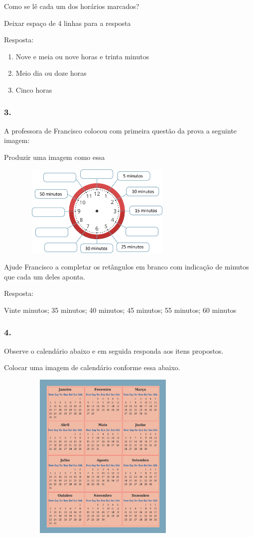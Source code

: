 Como se lê cada um dos horários marcados?

Deixar espaço de 4 linhas para a resposta

Resposta:

\begin{enumerate}
\def\labelenumi{\alph{enumi})}
\item
  Nove e meia ou nove horas e trinta minutos
\item
  Meio dia ou doze horas
\item
  Cinco horas
\end{enumerate}

\subsubsection{3.}\label{section-66}

A professora de Francisco colocou com primeira questão da prova a
seguinte imagem:

Produzir uma imagem como essa

\includegraphics[width=3.90034in,height=1.75015in]{media/image53.png}

Ajude Francisco a completar os retângulos em branco com indicação de
minutos que cada um deles aponta.

Resposta:

Vinte minutos; 35 minutos; 40 minutos; 45 minutos; 55 minutos; 60
minutos

\subsubsection{4.}\label{section-67}

Observe o calendário abaixo e em seguida responda aos itens propostos.

Colocar uma imagem de calendário conforme essa abaixo.

\includegraphics[width=4.13369in,height=3.20861in]{media/image54.png}

